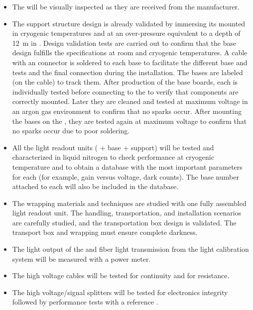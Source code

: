 \begin{itemize}
\item The  will be visually inspected as they are received from the manufacturer.

\item 
The  support structure design is already validated by immersing its mounted  in cryogenic temperatures and at an over-pressure equivalent to a depth of \SI{12}{m} in \lar{}. Design validation tests are carried out to confirm that the  base design fulfills the specifications at room and cryogenic temperatures. A cable with an  connector is soldered to each  base to facilitate the different base and  tests and the final  connection during the installation. The  bases are labeled (on the cable) to track them. After production of the  base boards, each is individually tested before connecting to the  to verify that components are correctly mounted. Later they are cleaned and tested at maximum voltage in an argon gas environment to confirm that no sparks occur. After mounting the bases on the , they are tested again %
at maximum voltage to confirm that no sparks occur due to poor soldering.

\item All the light readout units ( + base + support) will be tested and characterized in liquid nitrogen to check performance at cryogenic temperature and to obtain a database with the most important parameters for each  (for example, gain versus voltage, dark counts). The  base number attached to each  will also be included in the database.

\item The wrapping materials and techniques are studied with one fully assembled light readout unit. The handling, transportation, and installation scenarios are carefully studied, and the transportation box design is validated. The transport box and  wrapping must ensure complete darkness.

\item The light output of the  and fiber light transmission from the light calibration system will be measured with a power meter.

\item The high voltage cables will be tested for continuity and for resistance.

\item The high voltage/signal splitters will be tested for electronics integrity followed by  performance tests with a reference .

\end{itemize}

